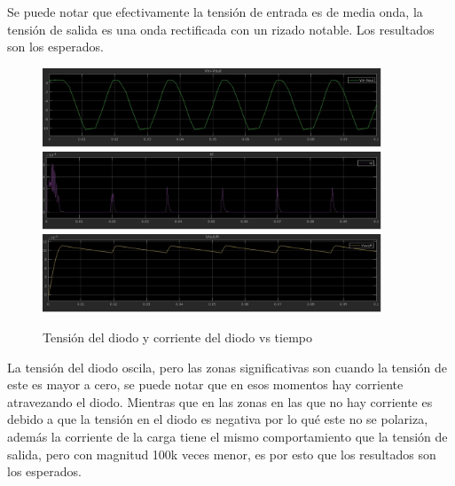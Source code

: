 Se puede notar que efectivamente la tensión de entrada es de media onda, 
la tensión de salida es una onda rectificada con un rizado notable.
Los resultados son los esperados.

\begin{figure}[H]\label{fig:vd}
    \centering
    \includegraphics[width=0.9\textwidth]{imagenes/VD.jpg}
    \includegraphics[width=0.9\textwidth]{imagenes/ID.jpg}
    \includegraphics[width=0.9\textwidth]{imagenes/IR.jpg}
    
    \caption{Tensión del diodo y corriente del diodo vs tiempo}
\end{figure}

La tensión del diodo oscila, pero las zonas significativas son cuando la 
tensión de este es mayor a cero, se puede notar que en esos momentos 
hay corriente atravezando el diodo. Mientras que en las zonas en las que no hay
corriente es debido a que la tensión en el diodo es negativa por lo qué este no
se polariza, además la corriente de la carga tiene el mismo comportamiento que
la tensión de salida, pero con magnitud 100k veces menor,
es por esto que los resultados son los esperados.
